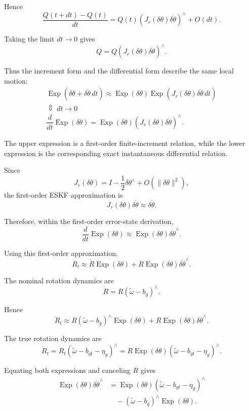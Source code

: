 \documentclass[11pt]{article}
\numberwithin{equation}{section}
\newcommand{\Exp}{\operatorname{Exp}}
\begin{document}
Hence
\[
\frac{Q(t+dt)-Q(t)}{dt}
=
Q(t)
\left(
J_r(\delta\theta)\delta\dot\theta
\right)^\wedge
+
O(dt).
\]

Taking the limit $dt\to0$ gives
\begin{equation}
\boxed{
\dot Q
=
Q
\left(
J_r(\delta\theta)\delta\dot\theta
\right)^\wedge.
}
\end{equation}

Thus the increment form and the differential form describe the same
local motion:
\begin{equation}
\boxed{
\begin{array}{c}
\Exp(\delta\theta+\delta\dot\theta\,dt)
\approx
\Exp(\delta\theta)
\Exp\!\left(
J_r(\delta\theta)\delta\dot\theta\,dt
\right)
\\[4mm]
\Updownarrow\; dt\to0
\\[4mm]
\dfrac{d}{dt}\Exp(\delta\theta)
=
\Exp(\delta\theta)
\left(
J_r(\delta\theta)\delta\dot\theta
\right)^\wedge.
\end{array}
}
\end{equation}

The upper expression is a first-order finite-increment relation, while
the lower expression is the corresponding exact instantaneous
differential relation.

Since
\[
J_r(\delta\theta)
=
I-\frac12\delta\theta^\wedge
+O(\|\delta\theta\|^2),
\]
the first-order ESKF approximation is
\[
J_r(\delta\theta)\delta\dot\theta
\approx
\delta\dot\theta.
\]

Therefore, within the first-order error-state derivation,
\begin{equation}
\boxed{
\frac{d}{dt}\Exp(\delta\theta)
\approx
\Exp(\delta\theta)\delta\dot\theta^\wedge.
}
\end{equation}

Using this first-order approximation,
\[
\dot R_t
\approx
\dot R\Exp(\delta\theta)
+
R\Exp(\delta\theta)\delta\dot\theta^\wedge.
\]

The nominal rotation dynamics are
\[
\dot R
=
R(\tilde\omega-b_g)^\wedge.
\]

Hence
\[
\dot R_t
\approx
R(\tilde\omega-b_g)^\wedge\Exp(\delta\theta)
+
R\Exp(\delta\theta)\delta\dot\theta^\wedge.
\]

The true rotation dynamics are
\[
\dot R_t
=
R_t(\tilde\omega-b_{gt}-\eta_g)^\wedge
=
R\Exp(\delta\theta)
(\tilde\omega-b_{gt}-\eta_g)^\wedge.
\]

Equating both expressions and canceling $R$ gives
\begin{align}
\Exp(\delta\theta)\delta\dot\theta^\wedge
&=
\Exp(\delta\theta)
(\tilde\omega-b_{gt}-\eta_g)^\wedge\\
&\quad
-(\tilde\omega-b_g)^\wedge
\Exp(\delta\theta).
\end{align}
\end{document}
